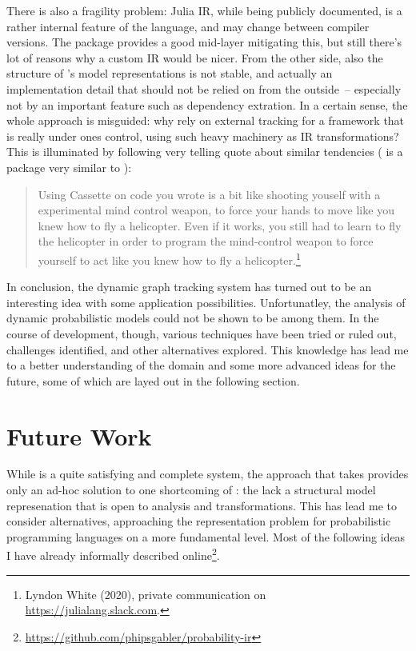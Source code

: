 There is also a fragility problem: Julia IR, while being publicly documented, is a rather internal
feature of the language, and may change between compiler versions.  The 
package provides a good mid-layer mitigating this, but still there's lot of reasons why a custom IR
would be nicer.  From the other side, also the structure of \dppljl{}'s model representations is not
stable, and actually an implementation detail that should not be relied on from the outside~--
especially not by an important feature such as dependency extration.  In a certain sense, the whole
approach is misguided: why rely on external tracking for a framework that is really under ones
control, using such heavy machinery as IR transformations?  This is illuminated by following very
telling quote about similar tendencies ( is a package very similar to
):
\begin{quote}
  Using Cassette on code you wrote is a bit like shooting youself with a experimental mind control
  weapon, to force your hands to move like you knew how to fly a helicopter.  Even if it works, you
  still had to learn to fly the helicopter in order to program the mind-control weapon to force
  yourself to act like you knew how to fly a helicopter.\footnote{Lyndon White (2020), private
    communication on \protect\url{https://julialang.slack.com}.}
\end{quote}

In conclusion, the dynamic graph tracking system has turned out to be an interesting idea with some
application possibilities.  Unfortunatley, the analysis of dynamic probabilistic models could not be
shown to be among them.  In the course of development, though, various techniques have been tried or
ruled out, challenges identified, and other alternatives explored.  This knowledge has lead me to a
better understanding of the domain and some more advanced ideas for the future, some of which are
layed out in the following section.

\section{Future Work}
\label{sec:future-work}

While \irtrackerjl{} is a quite satisfying and complete system, the approach that \autogibbsjl{}
takes provides only an ad-hoc solution to one shortcoming of \turingjl{}: the lack a structural
model represenation that is open to analysis and transformations.  This has lead me to consider
alternatives, approaching the representation problem for probabilistic programming languages on a
more fundamental level.  Most of the following ideas I have already informally described
online\footnote{\protect\url{https://github.com/phipsgabler/probability-ir}}.

